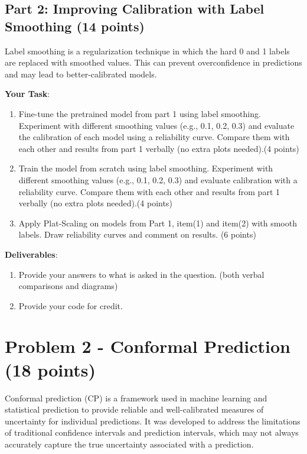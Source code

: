 \documentclass[11pt, oneside]{article}   	%
\begin{document}
\subsection*{Part 2: Improving Calibration with Label Smoothing (14 points)}
Label smoothing is a regularization technique in which the hard 0 and 1 labels are replaced with smoothed values. This can prevent overconfidence in predictions and may lead to better-calibrated models.

\textbf{Your Task}:
\begin{enumerate}
    
    \item Fine-tune the pretrained model from part 1 using label smoothing. Experiment with different smoothing values (e.g., 0.1, 0.2, 0.3) and evaluate the calibration of each model using a reliability curve. Compare them with each other and results from part 1 verbally (no extra plots needed).(4 points)

    \item Train the model from scratch using label smoothing. Experiment with different smoothing values (e.g., 0.1, 0.2, 0.3) and evaluate calibration with a reliability curve. Compare them with each other and results from part 1 verbally (no extra plots needed).(4 points)

    \item Apply Plat-Scaling on models from Part 1, item(1) and item(2) with smooth labels. Draw reliability curves and comment on results. (6 points)
    
\end{enumerate}

\textbf{Deliverables}:
\begin{enumerate}
    \item Provide your answers to what is asked in the question. (both verbal comparisons and diagrams)
    \item Provide your code for credit.
\end{enumerate}

\section*{Problem 2 - Conformal Prediction (18 points)}


Conformal prediction (CP) is a framework used in machine learning and statistical prediction to provide reliable and well-calibrated measures of uncertainty for individual predictions. It was developed to address the limitations of traditional confidence intervals and prediction intervals, which may not always accurately capture the true uncertainty associated with a prediction.
\end{document}
